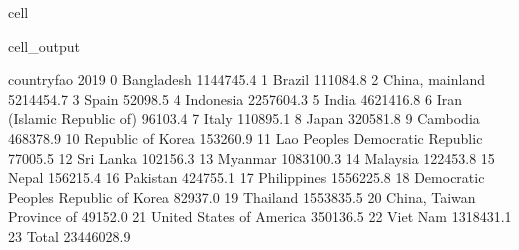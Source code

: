 \documentclass[letterpaper,10pt,english]{jupyterBook}
\begin{document}
\begin{sphinxuseclass}{cell}
\begin{sphinxVerbatimOutput}
\begin{sphinxuseclass}{cell_output}
\begin{sphinxVerbatim}[commandchars=\\\{\}]
                              country\PYGZus{}fao        2019  \PYGZbs{}
0                              Bangladesh   1144745.4   
1                                  Brazil    111084.8   
2                         China, mainland   5214454.7   
3                                   Spain     52098.5   
4                               Indonesia   2257604.3   
5                                   India   4621416.8   
6              Iran (Islamic Republic of)     96103.4   
7                                   Italy    110895.1   
8                                   Japan    320581.8   
9                                Cambodia    468378.9   
10                      Republic of Korea    153260.9   
11       Lao People\PYGZsq{}s Democratic Republic     77005.5   
12                              Sri Lanka    102156.3   
13                                Myanmar   1083100.3   
14                               Malaysia    122453.8   
15                                  Nepal    156215.4   
16                               Pakistan    424755.1   
17                            Philippines   1556225.8   
18  Democratic People\PYGZsq{}s Republic of Korea     82937.0   
19                               Thailand   1553835.5   
20              China, Taiwan Province of     49152.0   
21               United States of America    350136.5   
22                               Viet Nam   1318431.1   
23                                  Total  23446028.9   


\end{sphinxVerbatim}
\end{sphinxuseclass}
\end{sphinxVerbatimOutput}
\end{sphinxuseclass}
\end{document}
